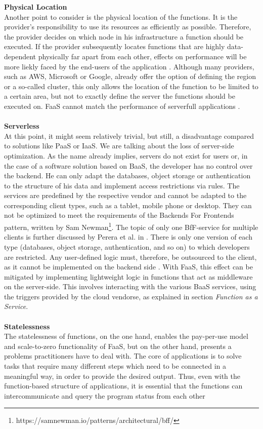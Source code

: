 \documentclass[a4paper,11pt, pagesize]{scrartcl}
\begin{document}
\begin{spacing}{1.2}
\textbf{Physical Location}\\ Another point to consider is the physical location of the functions. It is the provider's responsibility to use its resources as efficiently as possible. Therefore, the provider decides on which node in his infrastructure a function should be executed. If the provider subsequently locates functions that are highly data-dependent physically far apart from each other, effects on performance will be more liekly faced by the end-users of the application \cite{shafiei2020serverless}. Although many providers, such as AWS, Microsoft or Google, already offer the option of defining the region or a so-called cluster, this only allows the location of the function to be limited to a certain area, but not to exactly define the server the functions should be executed on. FaaS cannot match the performance of serverfull applications \cite{shafiei2020serverless}.\\\\ \textbf{Serverless}\\ At this point, it might seem relatively trivial, but still, a disadvantage compared to solutions like PaaS or IaaS. We are talking about the loss of server-side optimization. As the name already implies, servers do not exist for users or, in the case of a software solution based on BaaS, the developer has no control over the backend. He can only adapt the databases, object storage or authentication to the structure of his data and implement access restrictions via rules. The services are predefined by the respective vendor and cannot be adapted to the corresponding client types, such as a tablet, mobile phone or desktop. They can not be optimized to meet the requirements of the \glqq Backends For Frontends\grqq{} pattern, written by Sam Newman\footnote{https://samnewman.io/patterns/architectural/bff/}. The topic of only one BfF-service for multiple clients is further discussed by Perera et al. in \cite{perera2018rule}. There is only one version of each type (databases, object storage, authentication, and so on) to which developers are restricted. Any user-defined logic must, therefore, be outsourced to the client, as it cannot be implemented on the backend side \cite{fowler2018serverless}. With FaaS, this effect can be mitigated by implementing lightweight logic in functions that act as middleware on the server-side. This involves interacting with the various BaaS services, using the triggers provided by the cloud vendorse, as explained in section \textit{Function as a Service}.\\\\ \textbf{Statelessness}\\ The statelessness of functions, on the one hand, enables the pay-per-use model and scale-to-zero functionality of FaaS, but on the other hand, presents a problems practitioners have to deal with. The core of applications is to solve tasks that require many different steps which need to be connected in a meaningful way, in order to provide the desired output. Thus, even with the function-based structure of applications, it is essential that the functions can intercommunicate and query the program status from each other 
\end{spacing}
\end{document}

